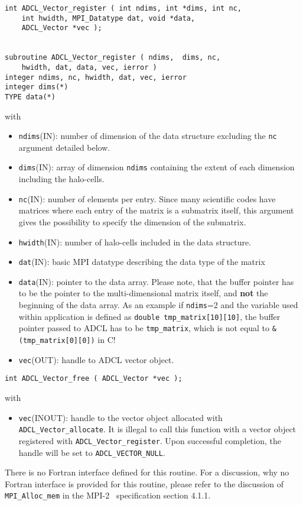 \hspace{1cm}
\begin{verbatim}
int ADCL_Vector_register ( int ndims, int *dims, int nc, 
    int hwidth, MPI_Datatype dat, void *data, 
    ADCL_Vector *vec );


subroutine ADCL_Vector_register ( ndims,  dims, nc, 
    hwidth, dat, data, vec, ierror )
integer ndims, nc, hwidth, dat, vec, ierror
integer dims(*)
TYPE data(*)
\end{verbatim}
with
\begin{itemize}
\item {\tt ndims}(IN): number of dimension of the data structure excluding the {\tt nc} argument detailed below.
\item {\tt dims}(IN): array of dimension {\tt ndims} containing the extent of each dimension including the halo-cells.
\item {\tt nc}(IN): number of elements per entry. Since many scientific codes have matrices where each entry of the 
	matrix is a submatrix itself, this argument gives the possibility to specify the dimension of the submatrix.
\item {\tt hwidth}(IN): number of halo-cells included in the data structure.
\item {\tt dat}(IN): basic MPI datatype describing the data type of the matrix
\item {\tt data}(IN): pointer to the data array. Please note, that the buffer pointer has to be the pointer to the multi-dimensional matrix itself, and {\bf not} the beginning of the data array. As an example if {\tt ndims}=2 and the variable used within application is defined as {\tt double tmp\_matrix[10][10]}, the buffer pointer passed to ADCL has to be {\tt tmp\_matrix}, which is not equal to {\tt \&(tmp\_matrix[0][0])} in C!
\item {\tt vec}(OUT): handle to ADCL vector object.
\end{itemize}

\hspace{1cm}

\begin{verbatim}
int ADCL_Vector_free ( ADCL_Vector *vec );
\end{verbatim}
with
\begin{itemize}
\item {\tt vec}(INOUT): handle to the vector object allocated with {\tt ADCL\_Vector\-\_allocate}. It is illegal to call 
 this function with a vector object registered with {\tt ADCL\_Vector\_register}. Upon successful completion, the handle will be set to {\tt ADCL\_VECTOR\_NULL}.
\end{itemize}
There is no Fortran interface defined for this routine. For a discussion, why no Fortran interface is provided for this routine, please refer to the discussion of {\tt MPI\_Alloc\_mem} in the MPI-2~\cite{mpi2} specification section 4.1.1.
\hspace{1cm}

